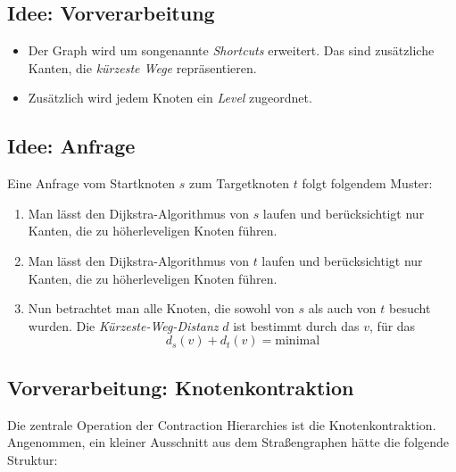 \documentclass{scrartcl}%
\begin{document}
    \subsection*{Idee: Vorverarbeitung}\label{subsec:idee:Vorverarbeitung}
    \begin{itemize}
        \item Der Graph wird um songenannte \textit{Shortcuts} erweitert.
        Das sind zusätzliche Kanten, die \textit{kürzeste Wege} repräsentieren.
        \item Zusätzlich wird jedem Knoten ein \textit{Level} zugeordnet.
    \end{itemize}

    \subsection*{Idee: Anfrage}
    Eine Anfrage vom Startknoten $s$ zum Targetknoten $t$ folgt folgendem Muster:
    \begin{enumerate}
        \item Man lässt den Dijkstra-Algorithmus von $s$ laufen und berücksichtigt nur Kanten, die zu höherleveligen Knoten führen.
        \item Man lässt den Dijkstra-Algorithmus von $t$ laufen und berücksichtigt nur Kanten, die zu höherleveligen Knoten führen.
        \item Nun betrachtet man alle Knoten, die sowohl von $s$ als auch von $t$ besucht wurden. Die
        \textit{Kürzeste-Weg-Distanz} $d$ ist bestimmt durch das $v$, für das
        \begin{equation*}
            d_s(v) + d_t(v) = \text{minimal}
        \end{equation*}
    \end{enumerate}

    \subsection*{Vorverarbeitung: Knotenkontraktion}
    Die zentrale Operation der Contraction Hierarchies ist die Knotenkontraktion. Angenommen, ein kleiner Ausschnitt aus dem Straßengraphen hätte die folgende Struktur:
    \begin{figure}[htb]
        \centering
    \end{figure}
\end{document}
